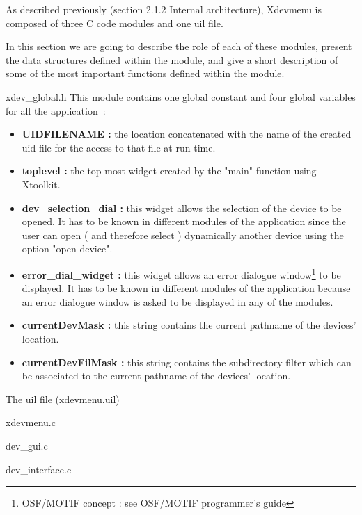 %
%
%
%
%
%
%
%
%
%
As described previously (section 2.1.2 Internal architecture), Xdevmenu is 
composed of three C code modules and one uil file.

In this section we are going to describe the role of each of these modules,
present the data structures defined within the module, and give a short
description of some of the most important functions defined within the module.

 {xdev\_global.h}
This module contains one global constant and four global variables for all the 
application~:
\begin {itemize}
\item
{\bf UIDFILENAME : } the location concatenated with the name of the created uid 
file for the access to that file at run time.
\item 
{\bf toplevel : } the top most widget created by the "main" function using
Xtoolkit.
\item
{\bf dev\_selection\_dial : } this widget allows the selection of the device
to be opened. It has to be known in different modules of the application since
the user can open ( and therefore select ) dynamically another device using the
option "open device". 
\item
{\bf error\_dial\_widget : } this widget allows an error dialogue 
window\footnote[1]{ OSF/MOTIF concept : see OSF/MOTIF programmer's guide } 
 to be
displayed. It has to be known in different modules of the application because
an error dialogue window is asked to be displayed in any of the modules.
\item
{\bf currentDevMask : } this string contains the current pathname of the 
devices' location.
\item
{\bf currentDevFilMask : } this string contains the subdirectory filter which
can be associated to the current pathname of the devices' location.
\end {itemize}



\newpage
{}	{The uil file (xdevmenu.uil)}



\newpage
{}	{xdevmenu.c}




\newpage
{}	{dev\_gui.c}



\newpage
{}	{dev\_interface.c}



